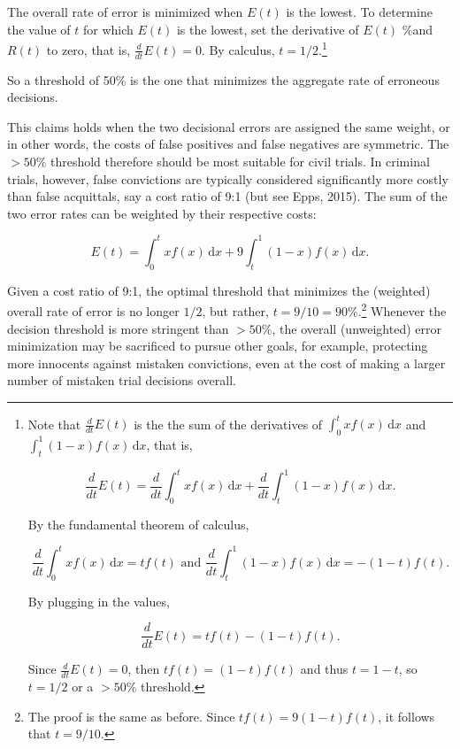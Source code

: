 \documentclass[10pt,dvipsnames]{scrartcl}
\begin{document}
The overall rate of error is minimized when \(E(t)\) is the lowest. To
determine the value of \(t\) for which \(E(t)\) is the lowest, set the
derivative of \(E(t)\) \%and \(R(t)\) to zero, that is,
\(\frac{d}{dt} E(t)= 0\). By calculus,
\(t=1/2\).\footnote{Note that $\frac{d}{dt}  E(t)$ is the the sum of the derivatives of $\int_0^t \! x f(x) \, \mathrm{d}x$ 
and 
$\int_t^1 \!(1-x) f(x) \, \mathrm{d}x$, that is,

\[\frac{d}{dt} E(t) = \frac{d}{dt}  \int_0^t \! x f(x) \, \mathrm{d}x + \frac{d}{dt}  \int_t^1 \! (1-x) f(x) \, \mathrm{d}x.\]

By the fundamental theorem of calculus, 

\[\frac{d}{dt}   \int_0^t \! x f(x) \, \mathrm{d}x = tf(t) \text{ and }
\frac{d}{dt}   \int_t^1 \! (1-x) f(x) \, \mathrm{d}x = -(1-t)f(t). \]

By plugging in the values, 

\[\frac{d}{dt}  E(t) = tf(t)  -(1-t)f(t). \]

Since $\frac{d}{dt}  E(t)= 0$, then $tf(t)  = (1-t)f(t)$
and thus
$t  = 1-t$, so 
$t  = 1/2$ or a $>50\%$ threshold.
}

So a threshold of 50\% is the one that minimizes the aggregate rate of
erroneous decisions.

This claims holds when the two decisional errors are assigned the same
weight, or in other words, the costs of false positives and false
negatives are symmetric. The \(>50\%\) threshold therefore should be
most suitable for civil trials. In criminal trials, however, false
convictions are typically considered significantly more costly than
false acquittals, say a cost ratio of 9:1 (but see Epps, 2015). The sum
of the two error rates can be weighted by their respective costs:

\[E(t) = \int_0^t \! x f(x) \, \mathrm{d}x + 9\int_t^1 \! (1-x) f(x) \, \mathrm{d}x.\]

Given a cost ratio of 9:1, the optimal threshold that minimizes the
(weighted) overall rate of error is no longer \(1/2\), but rather,
\(t=9/10=90\%\).\footnote{The proof is the same as before. Since $tf(t)  = 9(1-t)f(t)$, it follows that $t  = 9/10$.}
Whenever the decision threshold is more stringent than \(>50\%\), the
overall (unweighted) error minimization may be sacrificed to pursue
other goals, for example, protecting more innocents against mistaken
convictions, even at the cost of making a larger number of mistaken
trial decisions overall.
\end{document}
